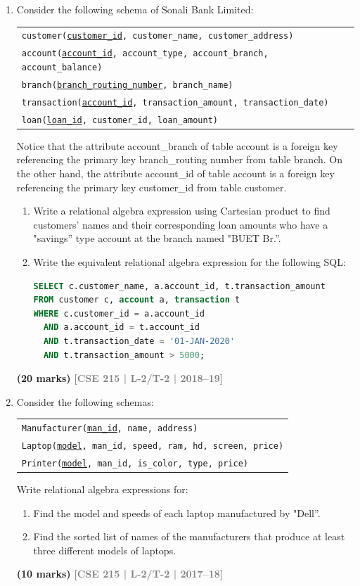 \documentclass[12pt]{article}
\newcommand{\yr}[1]{\hfill\textcolor{gray}{\small\textbf{[#1]}}}
\newcommand{\mk}[1]{\textcolor{orange!70!black}{\small\textbf{(#1 marks)}}}
\begin{document}
\begin{enumerate}
\item Consider the following schema of Sonali Bank Limited:
\begin{center}
\begin{tabular}{l}
\texttt{customer(\underline{customer\_id}, customer\_name, customer\_address)}\\
\texttt{account(\underline{account\_id}, account\_type, account\_branch, account\_balance)}\\
\texttt{branch(\underline{branch\_routing\_number}, branch\_name)}\\
\texttt{transaction(\underline{account\_id}, transaction\_amount, transaction\_date)}\\
\texttt{loan(\underline{loan\_id}, customer\_id, loan\_amount)}
\end{tabular}
\end{center}
Notice that the attribute account_branch of table account is a foreign key referencing
the primary key branch_routing number from table branch. On the other hand,
the attribute account_id of table account is a foreign key referencing the primary key
customer_id from table customer.
\begin{enumerate}
  \item Write a relational algebra expression using Cartesian product to find customers' names and their corresponding loan amounts who have a "savings'' type account at the branch named "BUET Br.''.
  \item Write the equivalent relational algebra expression for the following SQL:
\begin{lstlisting}[language=SQL]
SELECT c.customer_name, a.account_id, t.transaction_amount
FROM customer c, account a, transaction t
WHERE c.customer_id = a.account_id
  AND a.account_id = t.account_id
  AND t.transaction_date = '01-JAN-2020'
  AND t.transaction_amount > 5000;
\end{lstlisting}
\end{enumerate}
\mk{20} \yr{CSE 215 | L-2/T-2 | 2018--19}


\item Consider the following schemas:
\begin{center}
\begin{tabular}{l}
\texttt{Manufacturer(\underline{man\_id}, name, address)}\\
\texttt{Laptop(\underline{model}, man\_id, speed, ram, hd, screen, price)}\\
\texttt{Printer(\underline{model}, man\_id, is\_color, type, price)}
\end{tabular}
\end{center}
Write relational algebra expressions for:
\begin{enumerate}
  \item Find the model and speeds of each laptop manufactured by "Dell''.
  \item Find the sorted list of names of the manufacturers that produce at least three different models of laptops.
\end{enumerate}
\mk{10} \yr{CSE 215 | L-2/T-2 | 2017--18}



\end{enumerate}
\end{document}
